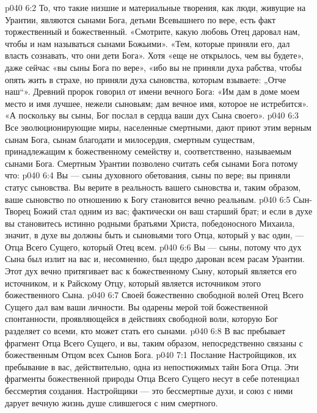\vs p040 6:2 То, что такие низшие и материальные творения, как люди, живущие на Урантии, являются сынами Бога, детьми Всевышнего по вере, есть факт торжественный и божественный. «Смотрите, какую любовь Отец даровал нам, чтобы и нам называться сынами Божьими». «Тем, которые приняли его, дал власть сознавать, что они дети Бога». Хотя «еще не открылось, чем вы будете», даже сейчас «вы сыны Бога по вере», «ибо вы не приняли духа рабства, чтобы опять жить в страхе, но приняли духа сыновства, которым взываете: „Отче наш“». Древний пророк говорил от имени вечного Бога: «Им дам в доме моем место и имя лучшее, нежели сыновьям; дам вечное имя, которое не истребится». «А поскольку вы сыны, Бог послал в сердца ваши дух Сына своего».
\vs p040 6:3 Все эволюционирующие миры, населенные смертными, дают приют этим верным сынам Бога, сынам благодати и милосердия, смертным существам, принадлежащим к божественному семейству и, соответственно, называемым сынами Бога. Смертным Урантии позволено считать себя сынами Бога потому что:
\vs p040 6:4 \bibnobreakspace Вы --- сыны духовного обетования, сыны по вере; вы приняли статус сыновства. Вы верите в реальность вашего сыновства и, таким образом, ваше сыновство по отношению к Богу становится вечно реальным.
\vs p040 6:5 \bibnobreakspace Сын\hyp{}Творец Божий стал одним из вас; фактически он ваш старший брат; и если в духе вы становитесь истинно родными братьями Христа, победоносного Михаила, значит, в духе вы должны быть и сыновьями того Отца, который у вас один, --- Отца Всего Сущего, который Отец всем.
\vs p040 6:6 \bibnobreakspace Вы --- сыны, потому что дух Сына был излит на вас и, несомненно, был щедро дарован всем расам Урантии. Этот дух вечно притягивает вас к божественному Сыну, который является его источником, и к Райскому Отцу, который является источником этого божественного Сына.
\vs p040 6:7 \bibnobreakspace Своей божественно свободной волей Отец Всего Сущего дал вам ваши личности. Вы одарены мерой той божественной спонтанности, проявляющейся в действиях свободной воли, которую Бог разделяет со всеми, кто может стать его сынами.
\vs p040 6:8 \bibnobreakspace В вас пребывает фрагмент Отца Всего Сущего, и вы, таким образом, непосредственно связаны с божественным Отцом всех Сынов Бога.
\vs p040 7:1 Послание Настройщиков, их пребывание в вас, действительно, одна из непостижимых тайн Бога Отца. Эти фрагменты божественной природы Отца Всего Сущего несут в себе потенциал бессмертия создания. Настройщики --- это бессмертные духи, и союз с ними дарует вечную жизнь душе слившегося с ним смертного.

